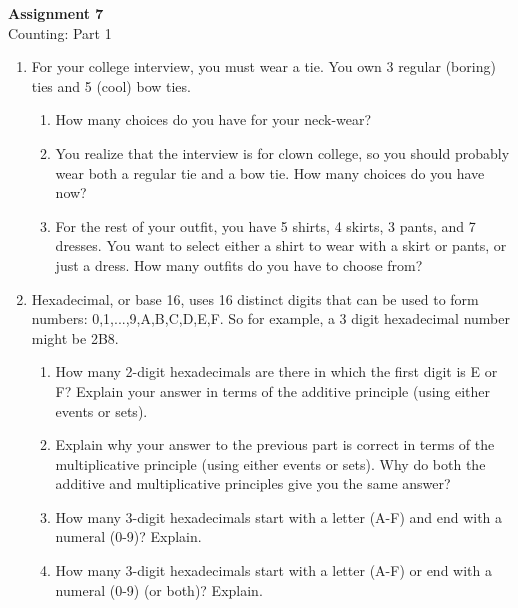 \documentclass[11pt, letterpaper, includehead]{article}
\theoremstyle{plain}
\theoremstyle{mydefinition}
\theoremstyle{myproperty}
\begin{document}
 

\pagestyle{fancy}
\fancyhead{}
\fancyfoot{}


\begin{center}
    \Large{\textbf{Assignment 7}}\\
    \Large{Counting: Part 1}
\end{center}

\begin{enumerate}[label=\textbf{\arabic*}., leftmargin=*]
\item For your college interview, you must wear a tie. You own 3 regular (boring) ties and 5 (cool) bow ties.
\begin{enumerate}[label=(\alph*)]
    \item How many choices do you have for your neck-wear?
    \item You realize that the interview is for clown college, so you should probably wear both a regular tie and a bow tie. How many choices do you have now?
    \item For the rest of your outfit, you have 5 shirts, 4 skirts, 3 pants, and 7 dresses. You want to select either a shirt to wear with a skirt or pants, or just a dress. How many outfits do you have to choose from?
\end{enumerate}

\item Hexadecimal, or base 16, uses 16 distinct digits that can be used to form numbers: {0,1,...,9,A,B,C,D,E,F}. So for example, a 3 digit hexadecimal number might be 2B8.
\begin{enumerate}[label=(\alph*)]
    \item How many 2-digit hexadecimals are there in which the first digit is E or F? Explain your answer in terms of the additive principle (using either events or sets).
    \item Explain why your answer to the previous part is correct in terms of the multiplicative principle (using either events or sets). Why do both the additive and multiplicative principles give you the same answer?
    \item How many 3-digit hexadecimals start with a letter (A-F) and end with a numeral (0-9)? Explain.
    \item How many 3-digit hexadecimals start with a letter (A-F) or end with a numeral (0-9) (or both)? Explain.
\end{enumerate}


\end{enumerate}
\end{document}
